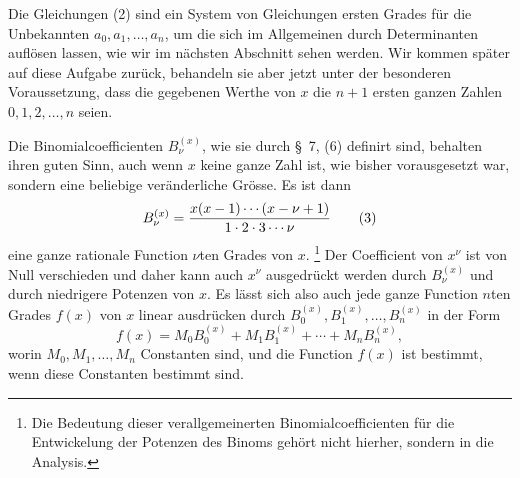 \documentclass[11pt]{article}
\begin{document}
Die Gleichungen (2) sind ein System von Gleichungen ersten Grades für die Unbekannten $a_0,a_1,\ldots,a_n$, um die sich im Allgemeinen durch Determinanten auflösen lassen, wie wir im nächsten Abschnitt sehen werden. Wir kommen später auf diese Aufgabe zurück, behandeln sie aber jetzt unter der besonderen Voraussetzung, dass die gegebenen Werthe von $x$ die $n+1$ ersten ganzen Zahlen $0,1,2,\ldots,n$ seien.

Die Binomialcoefficienten $B_\nu^{(x)}$, wie sie durch \S~7, (6) definirt sind, behalten ihren guten Sinn, auch wenn $x$ keine ganze Zahl ist, wie bisher vorausgesetzt war, sondern eine beliebige veränderliche Grösse. Es ist dann
\begin{equation}
 B_\nu^{(x)}={x(x-1)\cdots(x-\nu+1)\over 1\cdot2\cdot3\cdots\nu}
\tag{3}
\end{equation}
eine ganze rationale Function $\nu$ten Grades von $x$.
\footnote{Die Bedeutung dieser verallgemeinerten Binomialcoefficienten für die Entwickelung der Potenzen des Binoms gehört nicht hierher, sondern in die Analysis.}
Der Coefficient von $x^\nu$ ist von Null verschieden und daher kann auch $x^\nu$ ausgedrückt werden durch $B_\nu^{(x)}$ und durch niedrigere Potenzen von $x$. Es lässt sich also auch jede ganze Function $n$ten Grades $f(x)$ von $x$ linear ausdrücken durch $B_0^{(x)},B_1^{(x)},\ldots,B_n^{(x)}$ in der Form
\begin{equation}
 f(x)=M_0B_0^{(x)}+M_1B_1^{(x)}+\cdots+M_nB_n^{(x)},
\tag{4}
\end{equation}
worin $M_0,M_1,\ldots,M_n$ Constanten sind, und die Function $f(x)$ ist bestimmt, wenn diese Constanten bestimmt sind.
\end{document}
